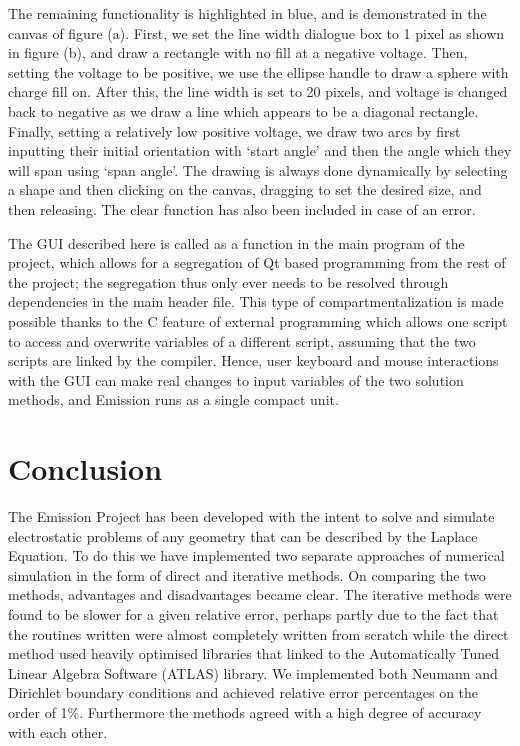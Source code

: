 \documentclass[a4paper]{article}
\begin{document}
The remaining functionality is highlighted in blue, and is demonstrated in the 
canvas of figure (a). First, we set the line width dialogue box to 1 pixel as 
shown in figure (b), and draw a rectangle with no fill at a negative voltage. 
Then, setting the voltage to be positive, we use the ellipse handle to draw a 
sphere with charge fill on. After this, the line width is set to 20 pixels, and 
voltage is changed back to negative as we draw a line which appears to be a 
diagonal rectangle. Finally, setting a relatively low positive voltage, we draw 
two arcs by first inputting their initial orientation with `start angle' and 
then the angle which they will span using `span angle'. The drawing is always 
done dynamically by selecting a shape and then clicking on the canvas, dragging 
to set the desired size, and then releasing. The clear function has also been 
included in case of an error.

The GUI described here is called as a function in the main program of the 
project, which allows for a segregation of Qt based programming from the rest of 
the project; the segregation thus only ever needs to be resolved through 
dependencies in the main header file. This type of compartmentalization is made 
possible thanks to the C feature of external programming which allows one 
script to access and overwrite variables of a different script, assuming that 
the two scripts are linked by the compiler. Hence, user keyboard and mouse 
interactions with the GUI can make real changes to input variables of the two 
solution methods, and Emission runs as a single compact unit. 

\section*{Conclusion}
The Emission Project has been developed with the intent to solve and simulate 
electrostatic problems of any geometry that can be described by the Laplace 
Equation.  To do this we have implemented two separate approaches of numerical
simulation in the form of direct and iterative methods. On comparing the two
methods, advantages and disadvantages became clear. The iterative methods were
found to be slower for a given relative error, perhaps partly due to the fact
that the routines written were almost completely written from scratch while the
direct method used heavily optimised libraries that linked to the Automatically
Tuned Linear Algebra Software (ATLAS) library. We implemented both Neumann and
Dirichlet boundary conditions and achieved relative error percentages on the
order of 1\%. Furthermore the methods agreed with a high degree of accuracy
with each other.  
\end{document}

